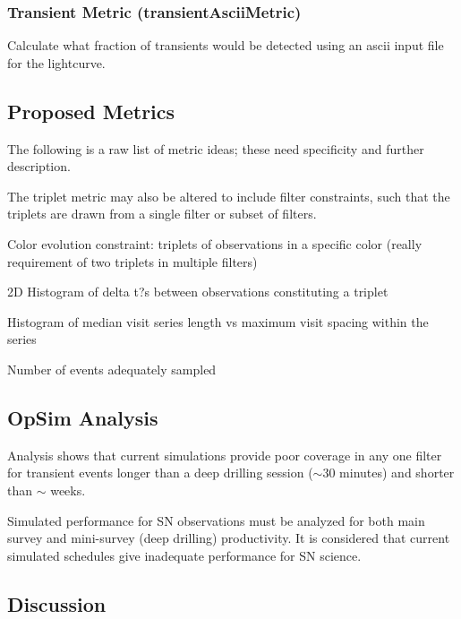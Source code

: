 \subsubsection{Transient Metric (transientAsciiMetric)}

Calculate what fraction of transients would be detected using an ascii input file for the lightcurve.

\subsection{Proposed Metrics}

The following is a raw list of metric ideas; these need specificity and further description. 

The triplet metric may also be altered to include filter constraints, such that the triplets are drawn from a single filter or subset of filters.  

Color evolution constraint: triplets of observations in a specific color (really requirement of two triplets in multiple filters)

  2D Histogram of delta t?s between observations constituting a triplet 

Histogram of median visit series length vs maximum visit spacing within the series

Number of events adequately sampled


\subsection{OpSim Analysis}
\label{sec:\secname:analysis}

Analysis shows that current simulations provide  poor coverage in any one filter for transient events longer than a deep drilling session ($\sim$30 minutes) and shorter than $\sim$ weeks.

Simulated performance for SN observations must be analyzed for both main survey and mini-survey (deep drilling) productivity.  It is considered that current simulated schedules give inadequate performance for SN science.




\subsection{Discussion}
\label{sec:\secname:discussion}

